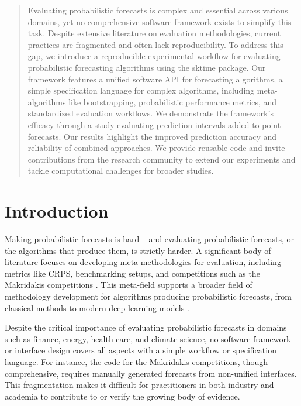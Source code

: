 
\begin{abstract}
Evaluating probabilistic forecasts is complex and essential across various domains, yet no comprehensive software framework exists to simplify this task. Despite extensive literature on evaluation methodologies, current practices are fragmented and often lack reproducibility. To address this gap, we introduce a reproducible experimental workflow for evaluating probabilistic forecasting algorithms using the sktime package. Our framework features a unified software API for forecasting algorithms, a simple specification language for complex algorithms, including meta-algorithms like bootstrapping, probabilistic performance metrics, and standardized evaluation workflows. We demonstrate the framework's efficacy through a study evaluating prediction intervals added to point forecasts. Our results highlight the improved prediction accuracy and reliability of combined approaches. We provide reusable code and invite contributions from the research community to extend our experiments and tackle computational challenges for broader studies.

\end{abstract}

\section{Introduction}
Making probabilistic forecasts is hard -- and evaluating probabilistic forecasts, or the algorithms that produce them, is strictly harder. A significant body of literature focuses on developing meta-methodologies for evaluation, including metrics like CRPS, benchmarking setups, and competitions such as the Makridakis competitions \cite{makridakis2020_m4, makridakis2022_m5}. This meta-field supports a broader field of methodology development for algorithms producing probabilistic forecasts, from classical methods to modern deep learning models \cite{chen2020probabilistic, gneiting2014probabilistic, nowotarski2018probabilistic, lagllama, decoder_foundation_forecasting}.

Despite the critical importance of evaluating probabilistic forecasts in domains such as finance, energy, health care, and climate science, no software framework or interface design covers all aspects with a simple workflow or specification language. For instance, the code for the Makridakis competitions, though comprehensive, requires manually generated forecasts from non-unified interfaces. This fragmentation makes it difficult for practitioners in both industry and academia to contribute to or verify the growing body of evidence.

